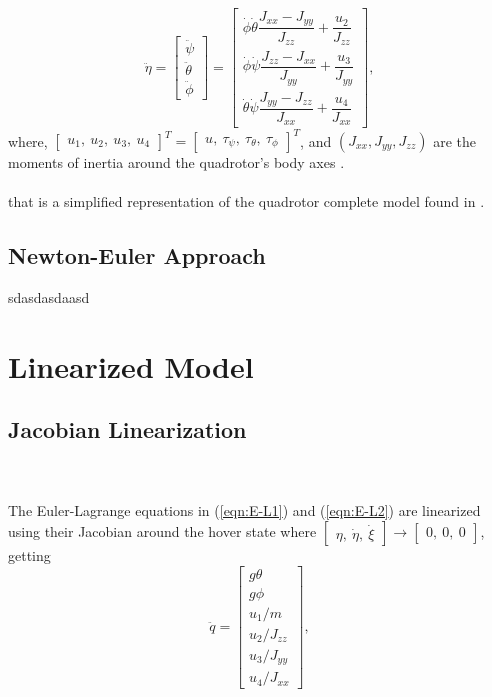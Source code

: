 \begin{equation}
\label{eqn:E-L2}
\ddot{\eta} =
\begin{bmatrix}
\ddot{\psi} \\ \ddot{\theta} \\ \ddot{\phi}
\end{bmatrix} 
 =
\begin{bmatrix}
\dot{\phi}\dot{\theta}\dfrac{J_{xx}-J_{yy}}{J_{zz}} + \dfrac{u_{2}}{J_{zz}} \\
\dot{\phi}\dot{\psi}\dfrac{J_{zz}-J_{xx}}{J_{yy}} + \dfrac{u_{3}}{J_{yy}} \\
 \dot{\theta}\dot{\psi}\dfrac{J_{yy}-J_{zz}}{J_{xx}} +  \dfrac{u_{4}}{J_{xx}}
\end{bmatrix},
\end{equation}
where, $\begin{bmatrix}
u_{1},\ u_{2},\ u_{3}, \ u_{4}
\end{bmatrix}^{T} = \begin{bmatrix}
u,\ \tau_{\psi},\ \tau_{\theta},\ \tau_{\phi}
\end{bmatrix}^{T} $, and $ (J_{xx}, J_{yy}, J_{zz}) $ are the moments of inertia around the quadrotor's body axes \cite{Emam2016, Badr2016}.
\\\\

that is a simplified representation of the quadrotor complete model found in \cite{Bouabdallah2007}.

\subsection{Newton-Euler Approach}
sdasdasdaasd

\section{Linearized Model}
\label{sec:linearized}
\setcounter{MaxMatrixCols}{20}
\subsection{Jacobian Linearization}
\cite{Sabatino2015}
\\\\
The Euler-Lagrange equations in (\ref{eqn:E-L1}) and (\ref{eqn:E-L2}) are linearized using their Jacobian around the hover state where $\begin{bmatrix}
\eta,\ \dot{\eta},\ \dot{\xi}
\end{bmatrix} \to \begin{bmatrix}
0,\ 0,\ 0
\end{bmatrix}$, getting
\begin{equation}
\label{eqn:linear}
\ddot{q}
=
\begin{bmatrix}
g\theta \\
g\phi\\
u_{1}/m \\
u_{2}/J_{zz} \\
u_{3}/J_{yy} \\
u_{4}/J_{xx}
\end{bmatrix},
\end{equation}

